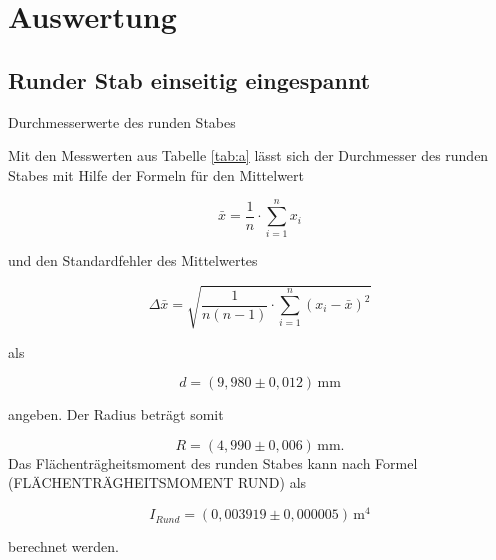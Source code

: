 \section{Auswertung}
\label{sec:Auswertung}
\subsection{Runder Stab einseitig eingespannt}
\begin{table}[H]
  \centering
  
  
  \caption{Durchmesserwerte des runden Stabes}
  \label{tab:a}
\end{table}

Mit den Messwerten aus Tabelle \ref{tab:a} lässt sich
der Durchmesser des runden Stabes mit Hilfe der Formeln
für den Mittelwert

\begin{equation}
  \bar{x}=\frac{1}{n} \cdot \sum_{i=1}^n x_i
  \label{eq:a}
\end{equation}

\noindent und den Standardfehler des Mittelwertes

\begin{equation}
  \Delta\bar{x}=\sqrt{\frac{1}{n(n-1)}\cdot \sum_{i=1}^n(x_i-\bar{x})^2}
  \label{eq:b}
\end{equation}

\noindent als 

\begin{equation*}
  d=(9,980 \pm 0,012)\,\si{\milli\meter}
\end{equation*}

\noindent angeben. Der Radius beträgt somit

\begin{equation*}
  R=(4,990 \pm 0,006)\,\si{\milli\meter}.
\end{equation*}
\noindent Das Flächenträgheitsmoment des runden Stabes kann nach Formel (FLÄCHENTRÄGHEITSMOMENT RUND)
als

\begin{equation*}
  I_{Rund}=(0,003919 \pm 0,000005)\,\si{\meter \tothe{4}}
\end{equation*}

\noindent berechnet werden. 


